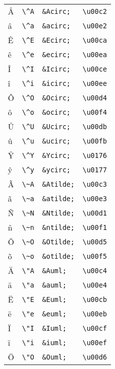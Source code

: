 \begin{longtable}[]{@{}llll@{}}
Â & \texttt{\textbackslash{}\^{}A} & \texttt{\&Acirc;} &
\texttt{\textbackslash{}u00c2}\tabularnewline
â & \texttt{\textbackslash{}\^{}a} & \texttt{\&acirc;} &
\texttt{\textbackslash{}u00e2}\tabularnewline
Ê & \texttt{\textbackslash{}\^{}E} & \texttt{\&Ecirc;} &
\texttt{\textbackslash{}u00ca}\tabularnewline
ê & \texttt{\textbackslash{}\^{}e} & \texttt{\&ecirc;} &
\texttt{\textbackslash{}u00ea}\tabularnewline
Î & \texttt{\textbackslash{}\^{}I} & \texttt{\&Icirc;} &
\texttt{\textbackslash{}u00ce}\tabularnewline
î & \texttt{\textbackslash{}\^{}i} & \texttt{\&icirc;} &
\texttt{\textbackslash{}u00ee}\tabularnewline
Ô & \texttt{\textbackslash{}\^{}O} & \texttt{\&Ocirc;} &
\texttt{\textbackslash{}u00d4}\tabularnewline
ô & \texttt{\textbackslash{}\^{}o} & \texttt{\&ocirc;} &
\texttt{\textbackslash{}u00f4}\tabularnewline
Û & \texttt{\textbackslash{}\^{}U} & \texttt{\&Ucirc;} &
\texttt{\textbackslash{}u00db}\tabularnewline
û & \texttt{\textbackslash{}\^{}u} & \texttt{\&ucirc;} &
\texttt{\textbackslash{}u00fb}\tabularnewline
Ŷ & \texttt{\textbackslash{}\^{}Y} & \texttt{\&Ycirc;} &
\texttt{\textbackslash{}u0176}\tabularnewline
ŷ & \texttt{\textbackslash{}\^{}y} & \texttt{\&ycirc;} &
\texttt{\textbackslash{}u0177}\tabularnewline
Ã & \texttt{\textbackslash{}\textasciitilde{}A} & \texttt{\&Atilde;} &
\texttt{\textbackslash{}u00c3}\tabularnewline
ã & \texttt{\textbackslash{}\textasciitilde{}a} & \texttt{\&atilde;} &
\texttt{\textbackslash{}u00e3}\tabularnewline
Ñ & \texttt{\textbackslash{}\textasciitilde{}N} & \texttt{\&Ntilde;} &
\texttt{\textbackslash{}u00d1}\tabularnewline
ñ & \texttt{\textbackslash{}\textasciitilde{}n} & \texttt{\&ntilde;} &
\texttt{\textbackslash{}u00f1}\tabularnewline
Õ & \texttt{\textbackslash{}\textasciitilde{}O} & \texttt{\&Otilde;} &
\texttt{\textbackslash{}u00d5}\tabularnewline
õ & \texttt{\textbackslash{}\textasciitilde{}o} & \texttt{\&otilde;} &
\texttt{\textbackslash{}u00f5}\tabularnewline
Ä & \texttt{\textbackslash{}"A} & \texttt{\&Auml;} &
\texttt{\textbackslash{}u00c4}\tabularnewline
ä & \texttt{\textbackslash{}"a} & \texttt{\&auml;} &
\texttt{\textbackslash{}u00e4}\tabularnewline
Ë & \texttt{\textbackslash{}"E} & \texttt{\&Euml;} &
\texttt{\textbackslash{}u00cb}\tabularnewline
ë & \texttt{\textbackslash{}"e} & \texttt{\&euml;} &
\texttt{\textbackslash{}u00eb}\tabularnewline
Ï & \texttt{\textbackslash{}"I} & \texttt{\&Iuml;} &
\texttt{\textbackslash{}u00cf}\tabularnewline
ï & \texttt{\textbackslash{}"i} & \texttt{\&iuml;} &
\texttt{\textbackslash{}u00ef}\tabularnewline
Ö & \texttt{\textbackslash{}"O} & \texttt{\&Ouml;} &
\texttt{\textbackslash{}u00d6}\tabularnewline

\end{longtable}
